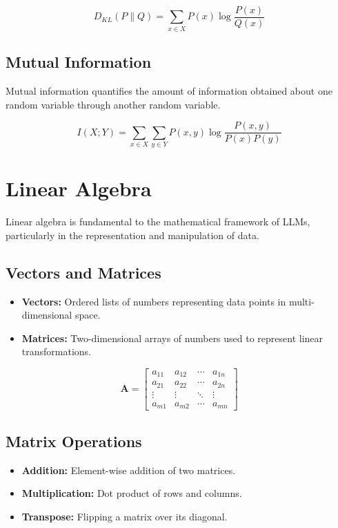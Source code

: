 \begin{equation}
D_{KL}(P \| Q) = \sum_{x \in X} P(x) \log \frac{P(x)}{Q(x)}
\end{equation}

\subsection{Mutual Information}
Mutual information quantifies the amount of information obtained about one random variable through another random variable.

\begin{equation}
I(X; Y) = \sum_{x \in X} \sum_{y \in Y} P(x, y) \log \frac{P(x, y)}{P(x)P(y)}
\end{equation}

\section{Linear Algebra}
Linear algebra is fundamental to the mathematical framework of LLMs, particularly in the representation and manipulation of data.

\subsection{Vectors and Matrices}
\begin{itemize}
    \item \textbf{Vectors:} Ordered lists of numbers representing data points in multi-dimensional space.
    \item \textbf{Matrices:} Two-dimensional arrays of numbers used to represent linear transformations.
\end{itemize}

\begin{equation}
\mathbf{A} = \begin{bmatrix}
a_{11} & a_{12} & \cdots & a_{1n} \\
a_{21} & a_{22} & \cdots & a_{2n} \\
\vdots & \vdots & \ddots & \vdots \\
a_{m1} & a_{m2} & \cdots & a_{mn}
\end{bmatrix}
\end{equation}

\subsection{Matrix Operations}
\begin{itemize}
    \item \textbf{Addition:} Element-wise addition of two matrices.
    \item \textbf{Multiplication:} Dot product of rows and columns.
    \item \textbf{Transpose:} Flipping a matrix over its diagonal.
\end{itemize}

